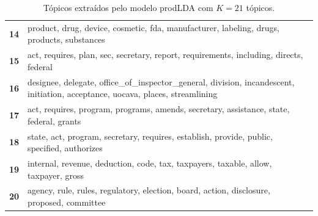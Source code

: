 \begin{table}[htpb]
\begin{tabularx}{\textwidth}{@{}l X@{}}
        \textbf{14} & product, drug, device, cosmetic, fda, manufacturer, labeling, drugs, products, substances \\
        \textbf{15} & act, requires, plan, sec, secretary, report, requirements, including, directs, federal \\
        \textbf{16} & designee, delegate, office\_of\_inspector\_general, division, incandescent, initiation, acceptance, uocava, places, streamlining \\
        \textbf{17} & act, requires, program, programs, amends, secretary, assistance, state, federal, grants \\
        \textbf{18} & state, act, program, secretary, requires, establish, provide, public, specified, authorizes \\
        \textbf{19} & internal, revenue, deduction, code, tax, taxpayers, taxable, allow, taxpayer, gross \\
        \textbf{20} & agency, rule, rules, regulatory, election, board, action, disclosure, proposed, committee \\
        \bottomrule
    \end{tabularx}
    \caption{Tópicos extraídos pelo modelo prodLDA com $K=21$ tópicos.}
    \label{tab:topicos_prodlda_21}
\end{table}
